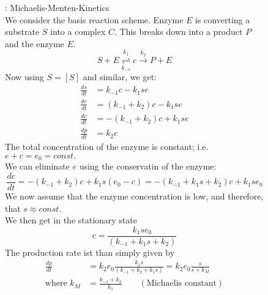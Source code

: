 \begin{figure}[H]
	\textbf{\underline{\underline{}}}: Michaelis-Menten-Kinetics\vspace{0.2cm}\\
	We consider the basis reaction scheme. Enzyme $E$ is converting a substrate $S$ into a complex $C$. This breaks down into a product $P$ and the enzyme $E$.
	\begin{equation*}
		S+E\overset{k_1}{\underset{k_{-1}}{\rightleftharpoons}} c\overset{k_2}{\to}P+E
	\end{equation*}
	Now using $S=[S]$ and similar, we get:
	\begin{align*}
		\frac{ds}{dt}&=k_{-1}c-k_1se\\
		\frac{de}{dt}&=(k_{-1}+k_2)c-k_{1}se\\
		\frac{dc}{dt}&=-(k_{-1}+k_2)c+k_1se\\
		\frac{dp}{dt}&=k_2c
	\end{align*}
	The total concentration of the enzyme is constant; i.e. $e+c=e_0=const.$\\
	We can eliminate $e$ using the conservatin of the enzyme:
	\begin{equation*}
		\frac{dc}{dt}=-(k_{-1}+k_2)c+k_1s(e_0-c)=-(k_{-1}+k_1s+k_2)c+k_1se_0
	\end{equation*}
	We now assume that the enzyme concentration is low, and therefore, that $s\approx const.$\\
	We then get in the stationary state 
	\begin{equation*}
		c=\frac{k_1se_0}{(k_{-1}+k_1s+k_2)}
	\end{equation*}
	The production rate ist than simply given by
	\begin{align*}
		\frac{dp}{dt}&=k_2e_0\frac{k_1s}{(k_{-1}+k_2+k_1s)}=k_2e_0\frac{s}{s+k_M}\\
		\text{where } k_M&=\frac{k_{-1}+k_2}{k_1} \qquad (\text{Michaelis constant})
	\end{align*}
\end{figure}
